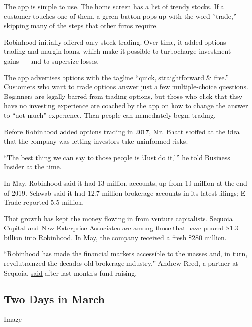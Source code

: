 The app is simple to use. The home screen has a list of trendy stocks.
If a customer touches one of them, a green button pops up with the word
``trade,'' skipping many of the steps that other firms require.

Robinhood initially offered only stock trading. Over time, it added
options trading and margin loans, which make it possible to turbocharge
investment gains --- and to supersize losses.

The app advertises options with the tagline ``quick, straightforward \&
free.'' Customers who want to trade options answer just a few
multiple-choice questions. Beginners are legally barred from trading
options, but those who click that they have no investing experience are
coached by the app on how to change the answer to ``not much''
experience. Then people can immediately begin trading.

Before Robinhood added options trading in 2017, Mr. Bhatt scoffed at the
idea that the company was letting investors take uninformed risks.

``The best thing we can say to those people is `Just do it,''' he
\href{https://www.businessinsider.com/robinhood-cofounder-baiju-bhatt-interview-2017-8}{told
Business Insider} at the time.

In May, Robinhood said it had 13 million accounts, up from 10 million at
the end of 2019. Schwab said it had 12.7 million brokerage accounts in
its latest filings; E-Trade reported 5.5 million.

That growth has kept the money flowing in from venture capitalists.
Sequoia Capital and New Enterprise Associates are among those that have
poured \$1.3 billion into Robinhood. In May, the company received a
fresh
\href{https://blog.robinhood.com/news/2020/5/4/robinhood-raises-280-million-in-series-f-funding-led-by-sequoia}{\$280
million}.

``Robinhood has made the financial markets accessible to the masses and,
in turn, revolutionized the decades-old brokerage industry,'' Andrew
Reed, a partner at Sequoia,
\href{https://blog.robinhood.com/news/2020/5/4/robinhood-raises-280-million-in-series-f-funding-led-by-sequoia}{said}
after last month's fund-raising.

\hypertarget{two-days-in-march}{%
\subsection{Two Days in March}\label{two-days-in-march}}

Image

